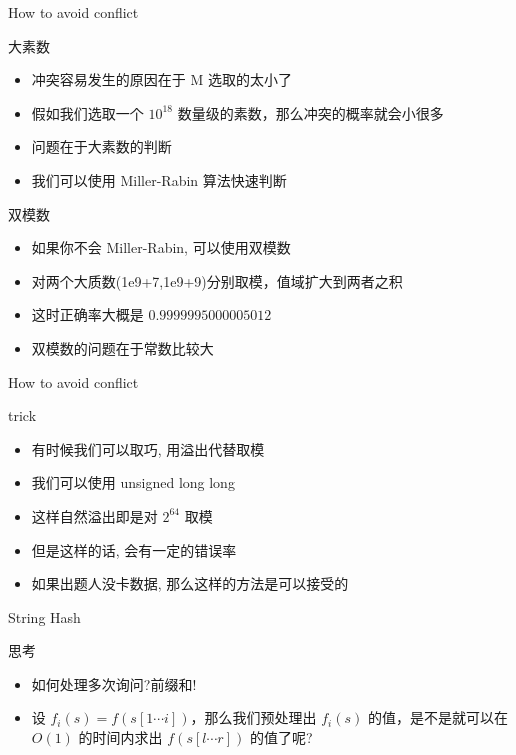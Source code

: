 \documentclass{ldr-simple-gray}
\begin{document}
  \begin{frame}{How to avoid conflict}
    \begin{block}{大素数}
      \begin{itemize}
        \item 冲突容易发生的原因在于 M 选取的太小了
        \item 假如我们选取一个 $10^{18}$ 数量级的素数，那么冲突的概率就会小很多
        \item 问题在于大素数的判断
        \item 我们可以使用 Miller-Rabin 算法快速判断
      \end{itemize}
    \end{block}
  
    \begin{block}{双模数}
      \begin{itemize}
        \item 如果你不会 Miller-Rabin, 可以使用双模数
        \item 对两个大质数(1e9+7,1e9+9)分别取模，值域扩大到两者之积
        \item 这时正确率大概是 $0.9999995000005012$
        \item 双模数的问题在于常数比较大
      \end{itemize}
    \end{block}
  \end{frame}
  
  \begin{frame}{How to avoid conflict}
    \begin{block}{trick}
      \begin{itemize}
        \item 有时候我们可以取巧, 用溢出代替取模
        \item 我们可以使用 unsigned long long
        \item 这样自然溢出即是对 $2^{64}$ 取模
        \item 但是这样的话, 会有一定的错误率
        \item 如果出题人没卡数据, 那么这样的方法是可以接受的
      \end{itemize}
    \end{block}
  \end{frame}

  \begin{frame}{String Hash}
    \begin{block}{思考}
      \begin{itemize}
        \item 如何处理多次询问?前缀和!
        \item 设 $f_{i}(s)=f(s[1\cdots i])$，那么我们预处理出 $f_{i}(s)$ 的值，是不是就可以在 $O(1)$ 的时间内求出 $f(s[l\cdots r])$ 的值了呢?
      \end{itemize}
    \end{block}
  \end{frame}
\end{document}
